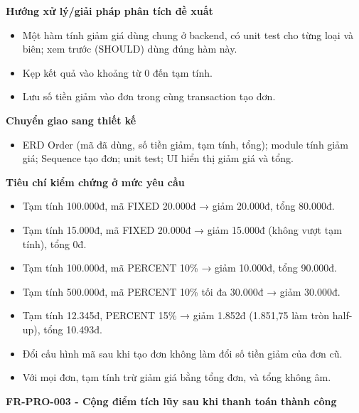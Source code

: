 \documentclass[11pt,a4paper,oneside]{report}
\begin{document}
\textbf{Hướng xử lý/giải pháp phân tích đề xuất}

\begin{itemize}
\item
  Một hàm tính giảm giá dùng chung ở backend, có unit test cho từng loại và biên; xem trước (SHOULD) dùng đúng hàm này.
\item
  Kẹp kết quả vào khoảng từ 0 đến tạm tính.
\item
  Lưu số tiền giảm vào đơn trong cùng transaction tạo đơn.
\end{itemize}

\textbf{Chuyển giao sang thiết kế}

\begin{itemize}
\item
  ERD Order (mã đã dùng, số tiền giảm, tạm tính, tổng); module tính giảm giá; Sequence tạo đơn; unit test; UI hiển thị giảm giá và tổng.
\end{itemize}

\textbf{Tiêu chí kiểm chứng ở mức yêu cầu}

\begin{itemize}
\item
  Tạm tính 100.000đ, mã FIXED 20.000đ → giảm 20.000đ, tổng 80.000đ.
\item
  Tạm tính 15.000đ, mã FIXED 20.000đ → giảm 15.000đ (không vượt tạm tính), tổng 0đ.
\item
  Tạm tính 100.000đ, mã PERCENT 10\% → giảm 10.000đ, tổng 90.000đ.
\item
  Tạm tính 500.000đ, mã PERCENT 10\% tối đa 30.000đ → giảm 30.000đ.
\item
  Tạm tính 12.345đ, PERCENT 15\% → giảm 1.852đ (1.851,75 làm tròn half-up), tổng 10.493đ.
\item
  Đổi cấu hình mã sau khi tạo đơn không làm đổi số tiền giảm của đơn cũ.
\item
  Với mọi đơn, tạm tính trừ giảm giá bằng tổng đơn, và tổng không âm.
\end{itemize}

\textbf{FR-PRO-003 - Cộng điểm tích lũy sau khi thanh toán thành công}
\end{document}
